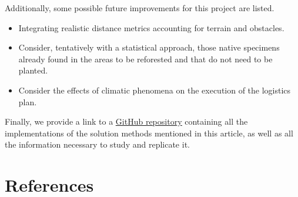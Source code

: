 \documentclass{amsart}
\begin{document}
    Additionally, some possible future improvements for this project are listed.
    
    \begin{itemize}
        \item Integrating realistic distance metrics accounting for terrain and obstacles.
        \item Consider, tentatively with a statistical approach, those native specimens already found in the areas to be reforested and that do not need to be planted.
        \item Consider the effects of climatic phenomena on the execution of the logistics plan.
    \end{itemize}
    
    Finally, we provide a link to a \underline{\href{https://github.com/JuanjoBelt/VRP-ReforestationTransportLogistics}{GitHub repository}} containing all the implementations of the solution methods mentioned in this article, as well as all the information necessary to study and replicate it.


    \section{References}
    \printbibliography[title={References}, heading=none]

    
 
\end{document}
